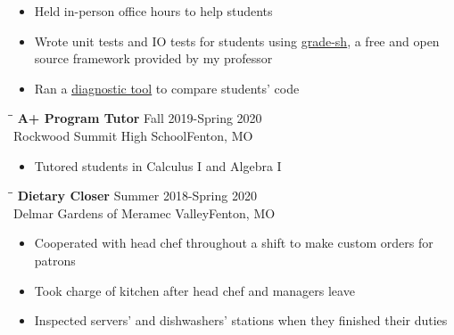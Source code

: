 \documentclass{res}
\begin{document}
\begin{resume}
\begin{tabbing}
   \end{tabbing}\vspace{-20pt}      %
    		\begin{itemize}
    			\item Held in-person office hours to help students
    			\item Wrote unit tests and IO tests for students using
    			\textcolor{blue}{\underline{\href{https://gitlab.com/classroomcode/grade-sh/grade-sh}{grade-sh}}}, 
    			a free and open source framework provided by my professor
    			\item Ran a 
    			\textcolor{blue}{\underline{\href{https://gitlab.com/classroomcode/copy_checker}{diagnostic tool}}}
    			to compare students' code
    		\end{itemize}
   \begin{tabbing}
   \hspace{2.3in}\= \hspace{2.6in}\= \kill %
    {\bf A+ Program Tutor} \>\>Fall 2019-Spring 2020\\
     	Rockwood Summit High School\>\>Fenton, MO\\
   \end{tabbing}\vspace{-20pt}
    \begin{itemize}
    		\item Tutored students in Calculus I and Algebra I
    \end{itemize}
    \begin{tabbing}
   \hspace{2.3in}\= \hspace{2.6in}\= \kill %
    {\bf Dietary Closer} \>\>Summer 2018-Spring 2020\\
     	Delmar Gardens of Meramec Valley\>\>Fenton, MO\\
   \end{tabbing}\vspace{-20pt}
    \begin{itemize}
    		\item Cooperated with head chef throughout a shift to
    		make custom orders for patrons
    		\item Took charge of kitchen after head chef and managers leave
    		\item Inspected servers' and dishwashers' stations when they finished
    		their duties
    \end{itemize}
            



\end{resume}
\end{document}
